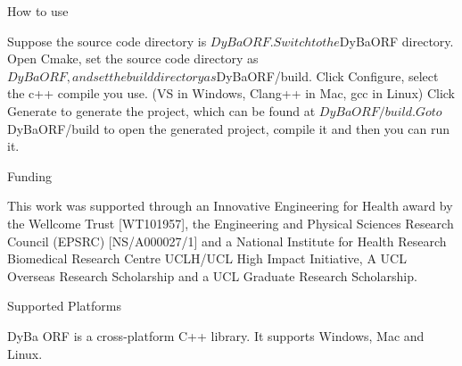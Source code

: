 How to use \begin{DoxyVerb}Suppose the source code directory is $DyBaORF.
Switch to the $DyBaORF directory.
Open Cmake, set the source code directory as $DyBaORF, and set the build directory as $DyBaORF/build.
Click Configure, select the c++ compile you use. (VS in Windows, Clang++ in Mac, gcc in Linux)
Click Generate to generate the project, which can be found at $DyBaORF/build.
Go to $DyBaORF/build to open the generated project, compile it and then you can run it.
\end{DoxyVerb}


Funding \begin{DoxyVerb}This work was supported through an Innovative Engineering for Health award by the Wellcome Trust [WT101957], the Engineering and Physical Sciences Research Council (EPSRC) [NS/A000027/1] and a National Institute for Health Research Biomedical Research Centre UCLH/UCL High Impact Initiative, A UCL Overseas Research Scholarship and a UCL Graduate Research Scholarship.
\end{DoxyVerb}


Supported Platforms \begin{DoxyVerb}DyBa ORF is a cross-platform C++ library. It supports Windows, Mac and Linux.\end{DoxyVerb}
 